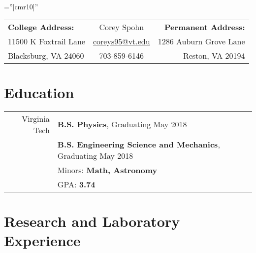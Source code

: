 \documentclass[a4paper,10pt]{article} %
\begin{document}
\pagestyle{empty} %

\font\fb=''[cmr10]'' %


\begin{center}
\setlength{\tabcolsep}{16.2pt}
\begin{tabular}{l | c | r} 
\textbf{College Address:}& \Huge Corey Spohn & \textbf{Permanent Address:}\\
11500 K Foxtrail Lane&\href{mailto:coreys95@vt.edu}{coreys95@vt.edu}&1286 Auburn Grove Lane \\
Blacksburg, VA 24060&703-859-6146&Reston, VA 20194\\
\bottomrule[1mm]
\end{tabular}

\end{center}



\section{Education}

\begin{tabular}{r|p{11.75cm}}	
Virginia Tech & \textbf{B.S. Physics}, Graduating May 2018\\
&\textbf{B.S. Engineering Science and Mechanics}, Graduating May 2018\\
&Minors: \textbf{Math, Astronomy}\\
&GPA: \bf{3.74}\\
\end{tabular}


\section{Research and Laboratory Experience}
\end{document}
